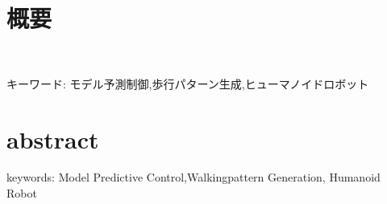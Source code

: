 \chapter*{概要}
\thispagestyle{empty}
%
\begin{center}
  \scalebox{1.5}{タイトル}\\
\end{center}
\vspace{1.0zh}
%


キーワード: モデル予測制御,歩行パターン生成,ヒューマノイドロボット
%
\newpage
\chapter*{abstract}
\thispagestyle{empty}
%
\begin{center}
  \scalebox{1.3}{title}
\end{center}
\vspace{1.0zh}
%


keywords: Model Predictive Control,Walkingpattern Generation, Humanoid Robot 
